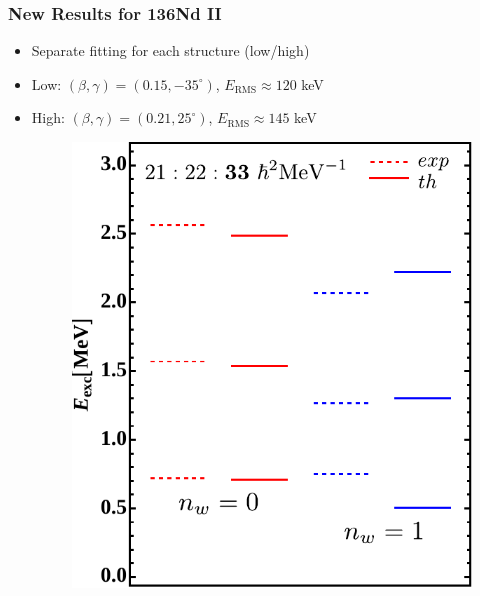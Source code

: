 \documentclass{beamer}
\begin{document}
\begin{frame}
  \frametitle{New Results for 136Nd II}
\begin{itemize}
  \item Separate fitting for each structure (low/high)
  \item Low: $(\beta,\gamma)=(0.15,-35^\circ)$, $E_\text{RMS}\approx 120$ keV
  \item High: $(\beta,\gamma)=(0.21,25^\circ)$, $E_\text{RMS}\approx 145$ keV
  \begin{figure}
    \centering
    \includegraphics[scale=0.458]{Figs/136Nd-excitation-lower-edited.pdf}

\end{figure}
\end{itemize}
\end{frame}
\end{document}
